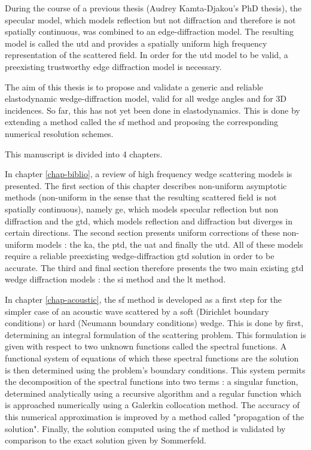 During the course of a previous thesis (Audrey Kamta-Djakou's PhD thesis), the specular model, which models reflection but not diffraction and therefore is not spatially continuous, was combined to an edge-diffraction model. The resulting model is called the \acrfull{utd} and provides a spatially uniform high frequency representation of the scattered field. In order for the \acrshort{utd} model to be valid, a preexisting trustworthy edge diffraction model is necessary.

The aim of this thesis is to propose and validate a generic and reliable elastodynamic wedge-diffraction model, valid for all wedge angles and for 3D incidences. So far, this has not yet been done in elastodynamics. This is done by extending a method called the \acrfull{sf} method and proposing the corresponding numerical resolution schemes. 

This manuscript is divided into 4 chapters.

In chapter \ref{chap-biblio}, a review of high frequency wedge scattering models is presented. The first section of this chapter describes non-uniform asymptotic methods (non-uniform in the sense that the resulting scattered field is not spatially continuous), namely \acrfull{ge}, which models specular reflection but non diffraction and the \acrfull{gtd}, which models reflection and diffraction but diverges in certain directions. The second section presents uniform corrections of these non-uniform models : the \acrfull{ka}, the \acrfull{ptd}, the \acrfull{uat} and finally the \acrfull{utd}. All of these models require a reliable preexisting wedge-diffraction \acrshort{gtd} solution in order to be accurate. The third and final section therefore presents the two main existing \acrshort{gtd} wedge diffraction models : the \acrfull{si} method and the \acrfull{lt} method.

In chapter \ref{chap-acoustic}, the \acrfull{sf} method is developed as a first step for the simpler case of an acoustic wave scattered by a soft (Dirichlet boundary conditions) or hard (Neumann boundary conditions) wedge. This is done by first, determining an integral formulation of the scattering problem. This formulation is given with respect to two unknown functions called the spectral functions. A functional system of equations of which these spectral functions are the solution is then determined using the problem's boundary conditions. This system permits the decomposition of the spectral functions into two terms : a singular function, determined analytically using a recursive algorithm and a regular function which is approached numerically using a Galerkin collocation method. The accuracy of this numerical approximation is improved by a method called "propagation of the solution". Finally, the solution computed using the \acrlong{sf} method is validated by comparison to the exact solution given by Sommerfeld.

